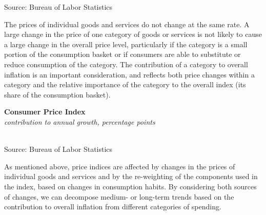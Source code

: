 \documentclass{report}
\newcommand{\tbllink}[1]{\href{https://raw.githubusercontent.com/bdecon/US-chartbook/master/chartbook/data/#1}{\faTable}}
\newcommand{\barylab}[2]{yticklabel style={text width=#1, align=right, 
		style={black!70}, text height=#2},}
\newcommand{\bbar}[2]{extra #1 ticks = {{#2}}, extra #1 tick labels = ,
		extra #1 tick style = {grid=major, grid style={thick, black!25}},}
\newcommand{\barplotnogrid}{xbar=0pt, axis line style={draw=none},
	    yticklabel style={align=left, anchor=east},
      		xmajorticks=false, ymajorgrids=false,   
	    ytick=data, tickwidth=0pt, area legend, reverse legend,
	    nodes near coords, nodes near coords align={horizontal},}
\begin{document}
{{\begin{minipage}{0.76\textwidth}
\footnotesize{Source: Bureau of Labor Statistics} \hfill \tbllink{cpi.csv}
\vspace{2mm}

\small The prices of individual goods and services do not change at the same rate. A large change in the price of one category of goods or services is not likely to cause a large change in the overall price level, particularly if the category is a small portion of the consumption basket or if consumers are able to substitute or reduce consumption of the category. The contribution of a category to overall inflation is an important consideration, and reflects both price changes within a category and the relative importance of the category to the overall index (its share of the consumption basket).
\end{minipage}

\begin{minipage}{0.29\textwidth}
\small 
\end{minipage} \hspace{5mm}
\begin{minipage}{0.42\textwidth}
\normalsize \textbf{Consumer Price Index}\\
\footnotesize{\textit{contribution to annual growth, percentage points}}\\
\\
\footnotesize{Source: Bureau of Labor Statistics} \hfill \tbllink{cpi_comp.csv}
\end{minipage}
\newpage
\begin{minipage}{0.76\textwidth}
\small As mentioned above, price indices are affected by changes in the prices of individual goods and services and by the re-weighting of the components used in the index, based on changes in consumption habits. By considering both sources of changes, we can decompose medium- or long-term trends based on the contribution to overall inflation from different categories of spending. 


\end{minipage}}}
\end{document}

